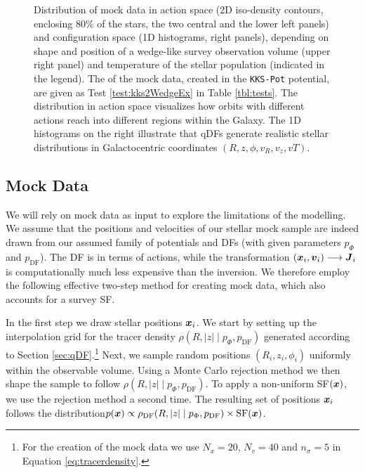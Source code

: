 

\begin{figure*}[!htbp]
\caption{Distribution of mock data in action space (2D iso-density contours, enclosing 80\% of the stars, the two central and the lower left panels) and configuration space (1D histograms, right panels), depending on shape and position of a wedge-like survey observation volume (upper right panel) and temperature of the stellar population (indicated in the legend). The \pmodel{} of the mock data, created in the \texttt{KKS-Pot} potential, are given as Test \ref{test:kks2WedgeEx} in Table \ref{tbl:tests}. The distribution in action space visualizes how orbits with different actions reach into different regions within the Galaxy. The 1D histograms on the right illustrate that qDFs generate realistic stellar distributions in Galactocentric coordinates $(R,z,\phi,v_R,v_z,vT)$. } 
\label{fig:kks2WedgeEx}
\end{figure*}




\subsection{Mock Data} \label{sec:mockdata}

We will rely on mock data as input to explore the limitations of the modelling. We assume that the positions and velocities of our stellar mock sample are indeed drawn from our assumed family of potentials and DFs (with given parameters $p_\Phi$ and $p_\text{DF}$). The DF is in terms of actions, while the transformation $(\boldsymbol{x}_i,\boldsymbol{v}_i) \longrightarrow \boldsymbol{J}_i$ is computationally much less expensive than the inversion. We therefore employ the following effective two-step method for creating mock data, which also accounts for a survey SF.

In the first step we draw stellar positions $\boldsymbol{x}_i$. We start by setting up the interpolation grid for the tracer density $\rho(R,|z| \mid p_\Phi, p_\text{DF})$ generated according to Section \ref{sec:qDF}.\footnote{For the creation of the mock data we use $N_x = 20$, $N_v = 40$ and $n_\sigma=5$ in Equation \ref{eq:tracerdensity}.} Next, we sample random positions $(R_i,z_i,\phi_i)$ uniformly within the observable volume. Using a Monte Carlo rejection method we then shape the sample to follow $\rho(R,|z| \mid p_\Phi, p_\text{DF})$. To apply a non-uniform SF$(\boldsymbol{x})$, we use the rejection method a second time. The resulting set of positions $\boldsymbol{x}_i$ follows the distribution$p(\boldsymbol{x}) \propto \rho_\text{DF}(R,|z| \mid p_{\Phi},p_\text{DF}) \times \text{SF}(\boldsymbol{x})$.

